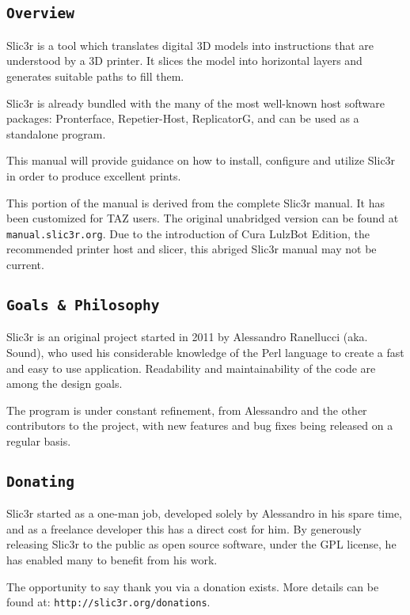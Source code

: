 
\subsection{\texttt{Overview}} %
\label{sec:overview}

Slic3r is a tool which translates digital 3D models into instructions that are understood by a 3D printer.  It slices the model into horizontal layers and generates suitable paths to fill them.

Slic3r is already bundled with the many of the most well-known host software packages: Pronterface, Repetier-Host, ReplicatorG, and can be used as a standalone program.

This manual will provide guidance on how to install, configure and utilize Slic3r in order to produce excellent prints.

This portion of the manual is derived from the complete Slic3r manual. It has been customized for TAZ users. The original unabridged version can be found at \texttt{manual.slic3r.org}. Due to the introduction of Cura LulzBot\textsuperscript{\miniscule{\texttrademark}} Edition, the recommended printer host and slicer, this abriged Slic3r manual may not be current.



\subsection{\texttt{Goals \& Philosophy}} %
\label{sec:goals_philosophy}

Slic3r is an original project started in 2011 by Alessandro Ranellucci (aka. Sound), who used his considerable knowledge of the Perl language to create a fast and easy to use application.  Readability and maintainability of the code are among the design goals.

The program is under constant refinement, from Alessandro and the other contributors to the project, with new features and bug fixes being released on a regular basis.



\subsection{\texttt{Donating}} %
\label{sec:donating}

Slic3r started as a one-man job, developed solely by Alessandro in his spare time, and as a freelance developer this has a direct cost for him.  By generously releasing Slic3r to the public as open source software, under the GPL license, he has enabled many to benefit from his work.

The opportunity to say thank you via a donation exists.  More details can be found at: \texttt{http://slic3r.org/donations}.

